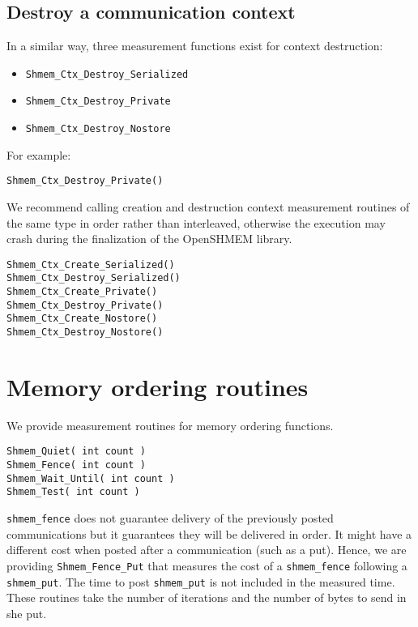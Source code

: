 \documentclass[12pt, letterpaper]{article}
\begin{document}
\subsection{Destroy a communication context}

In a similar way, three measurement functions exist for context destruction:

\begin{itemize}
\item {\tt Shmem\_Ctx\_Destroy\_Serialized}
\item {\tt Shmem\_Ctx\_Destroy\_Private}
\item {\tt Shmem\_Ctx\_Destroy\_Nostore}
\end{itemize}

For example:
\begin{lstlisting}
Shmem_Ctx_Destroy_Private()
\end{lstlisting}

We recommend calling creation and destruction context measurement routines of the same type in order rather than interleaved, otherwise the execution may crash during the finalization of the OpenSHMEM library.

\begin{lstlisting}
Shmem_Ctx_Create_Serialized()
Shmem_Ctx_Destroy_Serialized()
Shmem_Ctx_Create_Private()
Shmem_Ctx_Destroy_Private()
Shmem_Ctx_Create_Nostore()
Shmem_Ctx_Destroy_Nostore()
\end{lstlisting}

\section{Memory ordering routines}

We provide measurement routines for memory ordering functions.

\begin{lstlisting}
Shmem_Quiet( int count )
Shmem_Fence( int count )
Shmem_Wait_Until( int count )
Shmem_Test( int count )
\end{lstlisting}

{\tt shmem\_fence} does not guarantee delivery of the previously posted communications but it guarantees they will be delivered in  order. It might have a different cost  when posted after a communication (such as a put). Hence, we are providing {\tt Shmem\_Fence\_Put} that measures the cost of a {\tt shmem\_fence} following a {\tt shmem\_put}. The time to post {\tt shmem\_put} is not included in the measured time. These routines take the number of iterations and the number of bytes to send in she put.
\end{document}
